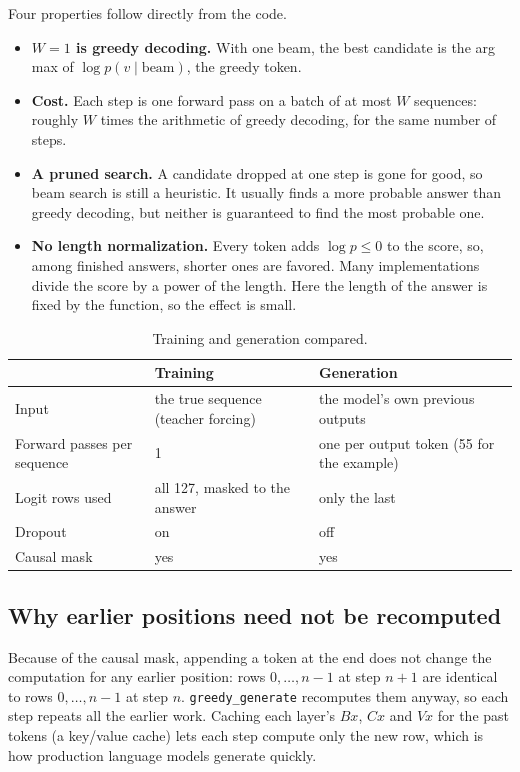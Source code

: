 \documentclass[11pt]{article}
\newcommand{\code}[1]{\texttt{#1}}
\begin{document}
Four properties follow directly from the code.
\begin{itemize}
\item \textbf{$W=1$ is greedy decoding.} With one beam, the best candidate is the
  arg max of $\log p(v\mid\text{beam})$, the greedy token.
\item \textbf{Cost.} Each step is one forward pass on a batch of at most $W$ sequences:
  roughly $W$ times the arithmetic of greedy decoding, for the same number of steps.
\item \textbf{A pruned search.} A candidate dropped at one step is gone for good, so beam
  search is still a heuristic. It usually finds a more probable answer than greedy
  decoding, but neither is guaranteed to find the most probable one.
\item \textbf{No length normalization.} Every token adds $\log p\le0$ to the score, so,
  among finished answers, shorter ones are favored. Many implementations divide the score
  by a power of the length. Here the length of the answer is fixed by the function, so the
  effect is small.
\end{itemize}

\begin{table}[h]
\centering\small
\caption{Training and generation compared.}
\label{tab:traingen}
\begin{tabular}{@{}lll@{}}
\toprule
 & Training & Generation \\
\midrule
Input & the true sequence (teacher forcing) & the model's own previous outputs \\
Forward passes per sequence & 1 & one per output token (55 for the example) \\
Logit rows used & all 127, masked to the answer & only the last \\
Dropout & on & off \\
Causal mask & yes & yes \\
\bottomrule
\end{tabular}
\end{table}

\subsection{Why earlier positions need not be recomputed}

Because of the causal mask, appending a token at the end does not change the
computation for any earlier position: rows $0,\dots,n-1$ at step $n+1$ are identical to
rows $0,\dots,n-1$ at step $n$. \code{greedy\_generate} recomputes them anyway, so each
step repeats all the earlier work. Caching each layer's $Bx$, $Cx$ and $Vx$ for the past
tokens (a key/value cache) lets each step compute only the new row, which is how
production language models generate quickly.
\end{document}

